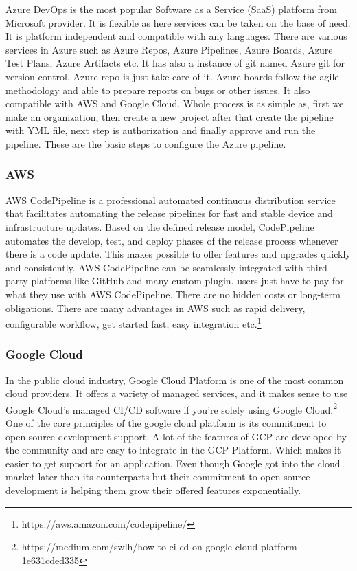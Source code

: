 Azure DevOps is the most popular  Software as a Service (SaaS) platform from Microsoft provider. It is flexible as here services can be taken on the base of need. It is platform independent and compatible with any languages. There are various services in Azure such as Azure Repos, Azure Pipelines, Azure Boards, Azure Test Plans, Azure Artifacts etc. It has also a instance of git named Azure git for version control. Azure repo is just take care of it. Azure boards follow the agile methodology and able to prepare reports on bugs or other issues. It also compatible with AWS and Google Cloud. Whole process is as simple as, first we make an organization, then create a new project after that create the pipeline with YML file, next step is authorization and finally approve and run the pipeline. These are the basic steps to configure the Azure pipeline.

%
\subsubsection{AWS}
%

AWS CodePipeline is a professional automated continuous distribution service that facilitates automating the release pipelines for fast and stable device and infrastructure updates. Based on the defined release model, CodePipeline automates the develop, test, and deploy phases of the release process whenever there is a code update. This makes possible to offer features and upgrades quickly and consistently. AWS CodePipeline can be seamlessly integrated with third-party platforms like GitHub and many custom plugin. users just have to pay for what they use with AWS CodePipeline. There are no hidden costs or long-term obligations. There are many advantages in AWS such as rapid delivery, configurable workflow, get started fast, easy integration etc.\footnote{https://aws.amazon.com/codepipeline/}

%
\subsubsection{Google Cloud}
%
In the public cloud industry, Google Cloud Platform is one of the most common cloud providers. It offers a variety of managed services, and it makes sense to use Google Cloud's managed CI/CD software if you're solely using Google Cloud.\footnote{https://medium.com/swlh/how-to-ci-cd-on-google-cloud-platform-1e631cded335} One of the core principles of the google cloud platform is its commitment to open-source development support. A lot of the features of GCP are developed by the community and are easy to integrate in the GCP Platform. Which makes it easier to get support for an application. Even though Google got into the cloud market later than its counterparts but their commitment to open-source development is helping them grow their offered features exponentially.  
%

